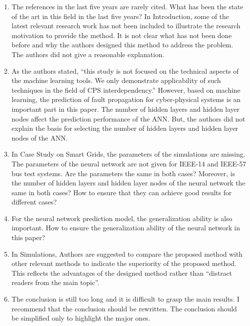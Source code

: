 \documentclass{article}
\begin{document}
\begin{enumerate}
  \item The references in the last five years are rarely cited. What has been the state of the art in this field in the last five years? In Introduction, some of the latest relevant research work has not been included to illustrate the research motivation to provide the method. It is not clear what has not been done before and why the authors designed this method to address the problem. The authors did not give a reasonable explanation.
  \item As the authors stated, ``this study is not focused on the technical aspects of the machine learning tools. We only demonstrate applicability of such techniques in the field of CPS interdependency.'' However, based on machine learning, the prediction of fault propagation for cyber-physical systems is an important part in this paper. The number of hidden layers and hidden layer nodes affect the prediction performance of the ANN. But, the authors did not explain the basis for selecting the number of hidden layers and hidden layer nodes of the ANN.
  \item In Case Study on Smart Grids, the parameters of the simulations are missing. The parameters of the neural network are not given for IEEE-14 and IEEE-57 bus test systems. Are the parameters the same in both cases? Moreover, is the number of hidden layers and hidden layer nodes of the neural network the same in both cases? How to ensure that they can achieve good results for different cases?
  \item For the neural network prediction model, the generalization ability is also important. How to ensure the generalization ability of the neural network in this paper?
  \item In Simulations, Authors are suggested to compare the proposed method with other relevant methods to indicate the superiority of the proposed method. This reflects the advantages of the designed method rather than ``distract readers from the main topic''.
  \item The conclusion is still too long and it is difficult to grasp the main results. I recommend that the conclusion should be rewritten. The conclusion should be simplified only to highlight the major ones.
\end{enumerate}
\end{document}
